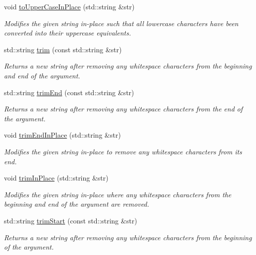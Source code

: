 \begin{DoxyCompactItemize}
void \mbox{\hyperlink{namespacesgl_1_1priv_1_1strlib_a5501f6f1a57507fd37a02c8eec4c26c6}{to\+Upper\+Case\+In\+Place}} (std\+::string \&str)
\begin{DoxyCompactList}\small\item\em Modifies the given string in-\/place such that all lowercase characters have been converted into their uppercase equivalents. \end{DoxyCompactList}\item 
std\+::string \mbox{\hyperlink{namespacesgl_1_1priv_1_1strlib_a5a01f705cc7b4a7317a57f6bf41aef25}{trim}} (const std\+::string \&str)
\begin{DoxyCompactList}\small\item\em Returns a new string after removing any whitespace characters from the beginning and end of the argument. \end{DoxyCompactList}\item 
std\+::string \mbox{\hyperlink{namespacesgl_1_1priv_1_1strlib_a369c1375de145427183c1b3e3e8b5fde}{trim\+End}} (const std\+::string \&str)
\begin{DoxyCompactList}\small\item\em Returns a new string after removing any whitespace characters from the end of the argument. \end{DoxyCompactList}\item 
void \mbox{\hyperlink{namespacesgl_1_1priv_1_1strlib_ac50a0b8051eb7e5400cd949e962dbc1a}{trim\+End\+In\+Place}} (std\+::string \&str)
\begin{DoxyCompactList}\small\item\em Modifies the given string in-\/place to remove any whitespace characters from its end. \end{DoxyCompactList}\item 
void \mbox{\hyperlink{namespacesgl_1_1priv_1_1strlib_a41b53191870377c67ad37dd21404df8d}{trim\+In\+Place}} (std\+::string \&str)
\begin{DoxyCompactList}\small\item\em Modifies the given string in-\/place where any whitespace characters from the beginning and end of the argument are removed. \end{DoxyCompactList}\item 
std\+::string \mbox{\hyperlink{namespacesgl_1_1priv_1_1strlib_a3a00e1a99ff51e899181bb9011238c93}{trim\+Start}} (const std\+::string \&str)
\begin{DoxyCompactList}\small\item\em Returns a new string after removing any whitespace characters from the beginning of the argument. \end{DoxyCompactList}\item 

\end{DoxyCompactItemize}
